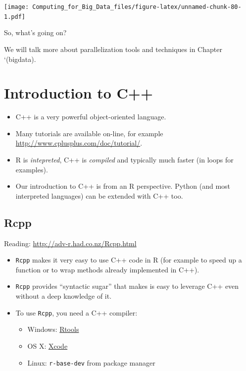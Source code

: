 \documentclass[]{book}
\providecommand{\tightlist}{%
  \setlength{\itemsep}{0pt}\setlength{\parskip}{0pt}}
\theoremstyle{definition}
\theoremstyle{definition}
\theoremstyle{definition}
\theoremstyle{remark}
\begin{document}
\texttt{[image: Computing\_for\_Big\_Data\_files/figure-latex/unnamed-chunk-80-1.pdf]}

So, what's going on?

We will talk more about parallelization tools and techniques in Chapter
`\citet{ref}(bigdata).

\section{Introduction to C++}\label{introduction-to-c}

\begin{itemize}
\item
  C++ is a very powerful object-oriented language.
\item
  Many tutorials are available on-line, for example
  \url{http://www.cplusplus.com/doc/tutorial/}.
\item
  R is \emph{intepreted}, C++ is \emph{compiled} and typically much
  faster (in loops for examples).
\item
  Our introduction to C++ is from an R perspective. Python (and most
  interpreted languages) can be extended with C++ too.
\end{itemize}

\subsection{Rcpp}\label{rcpp}

Reading: \url{http://adv-r.had.co.nz/Rcpp.html}

\begin{itemize}
\item
  \texttt{Rcpp} \citet{Eddelbuettel2013} makes it very easy to use C++
  code in R (for example to speed up a function or to wrap methods
  already implemented in C++).
\item
  \texttt{Rcpp} provides ``syntactic sugar'' that makes is easy to
  leverage C++ even without a deep knowledge of it.
\item
  To use \texttt{Rcpp}, you need a C++ compiler:

  \begin{itemize}
  \tightlist
  \item
    Windows:
    \href{https://cran.r-project.org/bin/windows/Rtools/}{Rtools}
  \item
    OS X: \href{https://developer.apple.com/xcode/}{Xcode}
  \item
    Linux: \texttt{r-base-dev} from package manager
  \end{itemize}
\end{itemize}
\end{document}
